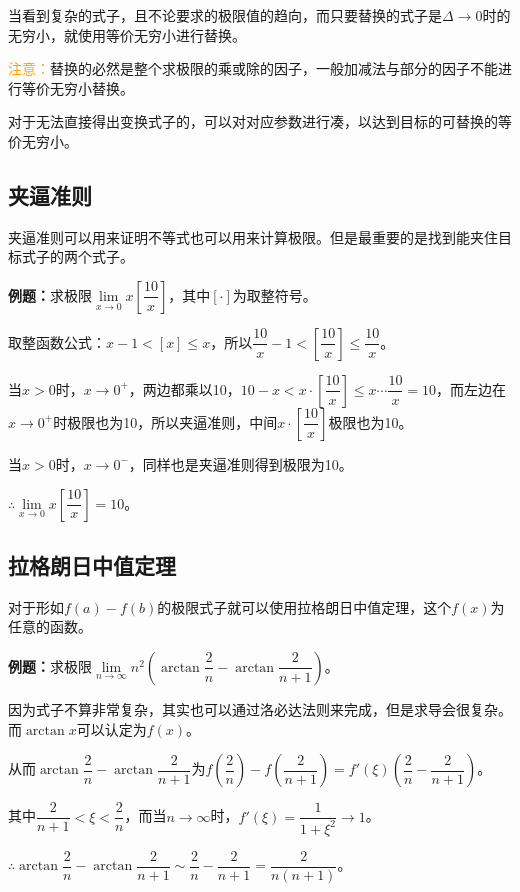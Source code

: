 \documentclass[UTF8, 12pt]{ctexart}
\begin{document}
当看到复杂的式子，且不论要求的极限值的趋向，而只要替换的式子是$\Delta\to 0$时的无穷小，就使用等价无穷小进行替换。

\textcolor{orange}{注意：}替换的必然是整个求极限的乘或除的因子，一般加减法与部分的因子不能进行等价无穷小替换。

对于无法直接得出变换式子的，可以对对应参数进行凑，以达到目标的可替换的等价无穷小。

\subsection{夹逼准则}

夹逼准则可以用来证明不等式也可以用来计算极限。但是最重要的是找到能夹住目标式子的两个式子。\medskip

\textbf{例题：}求极限$\lim\limits_{x\to 0}x\left[\dfrac{10}{x}\right]$，其中$[\cdot]$为取整符号。

取整函数公式：$x-1<[x]\leqslant x$，所以$\dfrac{10}{x}-1<\left[\dfrac{10}{x}\right]\leqslant\dfrac{10}{x}$。

当$x>0$时，$x\to 0^+$，两边都乘以10，$10-x<x\cdot\left[\dfrac{10}{x}\right]\leqslant x\cdots\dfrac{10}{x}=10$，而左边在$x\to 0^+$时极限也为10，所以夹逼准则，中间$x\cdot\left[\dfrac{10}{x}\right]$极限也为10。\medskip

当$x>0$时，$x\to 0^-$，同样也是夹逼准则得到极限为10。\medskip

$\therefore \lim\limits_{x\to 0}x\left[\dfrac{10}{x}\right]=10$。

\subsection{拉格朗日中值定理}

对于形如$f(a)-f(b)$的极限式子就可以使用拉格朗日中值定理，这个$f(x)$为任意的函数。

\textbf{例题：}求极限$\lim\limits_{n\to\infty}n^2\left(\arctan\dfrac{2}{n}-\arctan\dfrac{2}{n+1}\right)$。\medskip

因为式子不算非常复杂，其实也可以通过洛必达法则来完成，但是求导会很复杂。而$\arctan x$可以认定为$f(x)$。

从而$\arctan\dfrac{2}{n}-\arctan\dfrac{2}{n+1}$为$f(\dfrac{2}{n})-f(\dfrac{2}{n+1})=f'(\xi)\left(\dfrac{2}{n}-\dfrac{2}{n+1}\right)$。

其中$\dfrac{2}{n+1}<\xi<\dfrac{2}{n}$，而当$n\to\infty$时，$f'(\xi)=\dfrac{1}{1+\xi^2}\to 1$。

$\therefore\arctan\dfrac{2}{n}-\arctan\dfrac{2}{n+1}\sim\dfrac{2}{n}-\dfrac{2}{n+1}=\dfrac{2}{n(n+1)}$。
\end{document}
